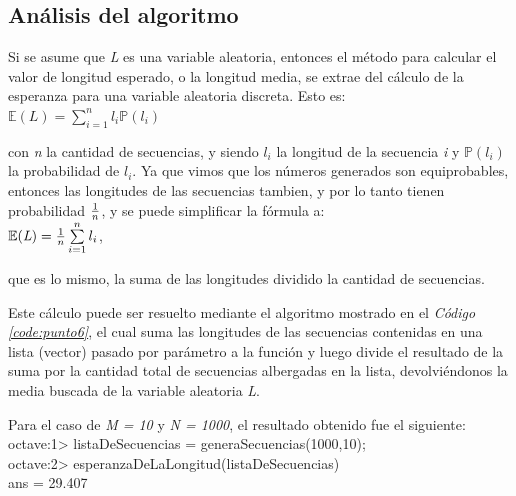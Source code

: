 \documentclass{article}
\newcommand{\refcode}[1]{\textit{Código \ref{#1}}}
\begin{document}

\bigskip

\subsection{Análisis del algoritmo}

	Si se asume que \textit{L} es una variable aleatoria, entonces el método para calcular el valor de longitud esperado, o la longitud media, se extrae del cálculo de la esperanza para una variable aleatoria discreta. Esto es:\\
	 
$\mathbb{E}(\textit{L}) = \sum\limits_{i=1}^n l_{i} \mathbb{P}(l_{i}) $

\bigskip
\noindent con \textit{n} la cantidad de secuencias, y siendo \textit{$l_i$} la longitud de la secuencia \textit{i} y \textit{$\mathbb{P}(l_i)$} la probabilidad de \textit{$l_i$}. Ya que vimos que los números generados son equiprobables, entonces las longitudes de las secuencias tambien, y por lo tanto tienen probabilidad $1 \over n$, y se puede simplificar la fórmula a:\\

\indent $\mathbb{E}(\textit{L}) = {1 \over n} \sum\limits_{i=1}^n l_{i} $,

\bigskip
\noindent que es lo mismo, la suma de las longitudes dividido la cantidad de secuencias. 
	\par
	Este cálculo puede ser resuelto mediante el algoritmo mostrado en el \refcode{code:punto6}, el cual suma las longitudes de las secuencias contenidas en una lista (vector) pasado por parámetro a la función y luego divide el resultado de la suma por la cantidad total de secuencias albergadas en la lista, devolviéndonos la media buscada de la variable aleatoria \textit{L}.\medskip


\bigskip

\bigskip 
\noindent Para el caso de \textit{M = 10} y \textit{N = 1000}, el resultado obtenido fue el siguiente:\\

{\ttfamily\footnotesize
\indent octave:1> listaDeSecuencias = generaSecuencias(1000,10);\\
\indent octave:2> esperanzaDeLaLongitud(listaDeSecuencias)\\
\indent ans =  29.407}
\end{document}

